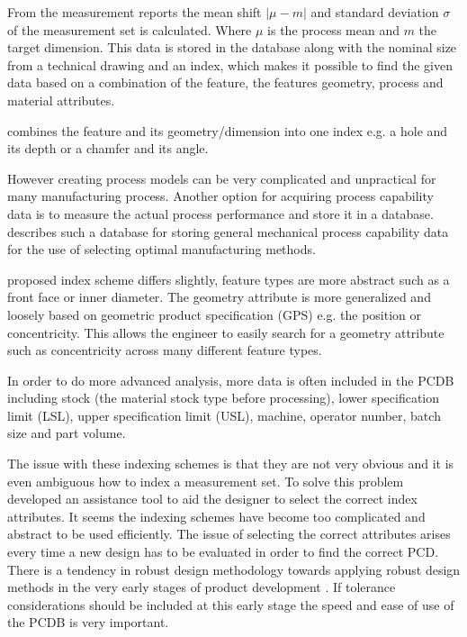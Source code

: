 \documentclass[aip,amsmath, reprint, author-year]{revtex4-1}
\begin{document}
From the measurement reports the mean shift $|\mu - m|$ and standard deviation $\sigma$ of the measurement set is calculated. 
Where $\mu$ is the process mean and $m$ the target dimension. This data is stored in the database along with the nominal size from a technical drawing and an index, which makes it possible to find the given data based on a combination of the feature, the features geometry, process and material attributes. 

\cite{thornton2004variation} combines the feature and its geometry/dimension into one index e.g. a hole and its depth or a chamfer and its angle. 

However creating process models can be very complicated and unpractical for many manufacturing process. 
Another option for acquiring process capability data is to measure the actual process performance and store it in a database. \cite{perzyk1998selection} describes such a database for storing general mechanical process capability data for the use of selecting optimal manufacturing methods.

\cite{kern2003forecasting}  proposed index scheme differs slightly, feature types are more abstract such as a front face or inner diameter. The geometry attribute is more generalized and loosely based on geometric product specification (GPS) e.g. the position or concentricity. This allows the engineer to easily search for a geometry attribute such as concentricity across many different feature types.

In order to do more advanced analysis, more data is often included in the PCDB including stock (the material stock type before processing), lower specification limit (LSL), upper specification limit (USL), machine, operator number, batch size and part volume.

The issue with these indexing schemes is that they are not very obvious and it is even ambiguous how to index a measurement set. To solve this problem \cite{kern2003forecasting} developed an assistance tool to aid the designer to select the correct index attributes. It seems the indexing schemes have become too complicated and abstract to be used efficiently. The issue of selecting the correct attributes arises every time a new design has to be evaluated in order to find the correct PCD. There is a tendency in robust design methodology towards applying robust design methods in the very early stages of product development \cite{ebro2012foundation}. If tolerance considerations should be included at this early stage the speed and ease of use of the PCDB is very important. 
\end{document}
